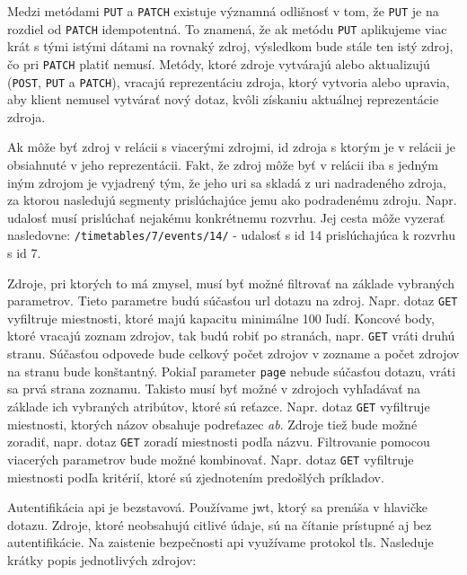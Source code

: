 Medzi metódami \texttt{PUT} a \texttt{PATCH} existuje významná odlišnosť v tom,
že \texttt{PUT} je na rozdiel od \texttt{PATCH} idempotentná. To znamená, že ak
metódu \texttt{PUT} aplikujeme viac krát s tými istými dátami na rovnaký zdroj,
výsledkom bude stále ten istý zdroj, čo pri \texttt{PATCH} platiť nemusí.
Metódy, ktoré zdroje vytvárajú alebo aktualizujú (\texttt{POST}, \texttt{PUT} a
\texttt{PATCH}), vracajú reprezentáciu zdroja, ktorý vytvoria alebo upravia,
aby klient nemusel vytvárať nový dotaz, kvôli získaniu aktuálnej reprezentácie
zdroja.

Ak môže byť zdroj v relácii s viacerými zdrojmi, \acrshort{id} zdroja s ktorým
je v relácii je obsiahnuté v jeho reprezentácii. Fakt, že zdroj môže byť v
relácii iba s jedným iným zdrojom je vyjadrený tým, že jeho \acrshort{uri} sa
skladá z \acrshort{uri} nadradeného zdroja, za ktorou nasledujú segmenty
prislúchajúce jemu ako podradenému zdroju. Napr. udalosť musí prislúchať
nejakému konkrétnemu rozvrhu. Jej cesta môže vyzerať nasledovne:
\texttt{/timetables/7/events/14/} - udalosť s \acrshort{id} 14 prislúchajúca k
rozvrhu s \acrshort{id} 7.

Zdroje, pri ktorých to má zmysel, musí byť možné filtrovať na základe vybraných
parametrov. Tieto parametre budú súčasťou \acrshort{url} dotazu na zdroj. Napr.
dotaz \texttt{GET}  vyfiltruje miestnosti, ktoré
majú kapacitu minimálne 100 ľudí. Koncové body, ktoré vracajú zoznam zdrojov,
tak budú robiť po stranách, napr. \texttt{GET}  vráti druhú
stranu. Súčasťou odpovede bude celkový počet zdrojov v zozname a počet zdrojov
na stranu bude konštantný. Pokiaľ parameter \texttt{page} nebude súčasťou
dotazu, vráti sa prvá strana zoznamu. Takisto musí byť možné v zdrojoch
vyhľadávať na základe ich vybraných atribútov, ktoré sú reťazce. Napr. dotaz
\texttt{GET}  vyfiltruje miestnosti, ktorých názov
obsahuje podreťazec \emph{ab}. Zdroje tiež bude možné zoradiť, napr. dotaz
\texttt{GET}  zoradí miestnosti podľa názvu.
Filtrovanie pomocou viacerých parametrov bude možné kombinovať. Napr. dotaz
\texttt{GET} 
vyfiltruje miestnosti podľa kritérií, ktoré sú zjednotením predošlých príkladov.

Autentifikácia \acrshort{api} je bezstavová. Používame \acrshort{jwt}, ktorý sa
prenáša v hlavičke dotazu. Zdroje, ktoré neobsahujú citlivé údaje, sú na čítanie
prístupné aj bez autentifikácie. Na zaistenie bezpečnosti \acrshort{api}
využívame protokol \acrshort{tls}. Nasleduje krátky popis jednotlivých zdrojov:


